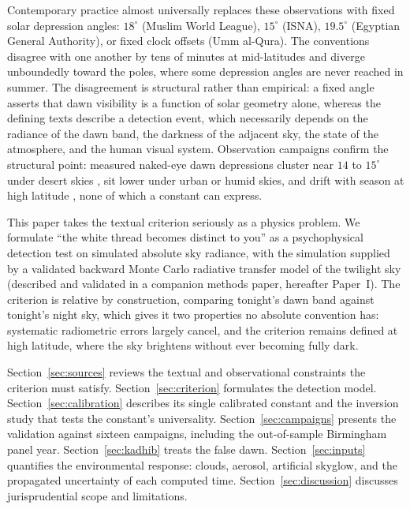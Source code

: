 \documentclass[preprint,12pt]{elsarticle}
\begin{document}
Contemporary practice almost universally replaces these observations with
fixed solar depression angles: $18^\circ$ (Muslim World League),
$15^\circ$ (ISNA), $19.5^\circ$ (Egyptian General Authority), or fixed
clock offsets (Umm al-Qura). The conventions disagree with one another by
tens of minutes at mid-latitudes and diverge unboundedly toward the
poles, where some depression angles are never reached in summer. The
disagreement is structural rather than empirical: a fixed angle asserts
that dawn visibility is a function of solar geometry alone, whereas the
defining texts describe a detection event, which necessarily depends on
the radiance of the dawn band, the darkness of the adjacent sky, the
state of the atmosphere, and the human visual system. Observation
campaigns confirm the structural point: measured naked-eye dawn
depressions cluster near $14$ to $15^\circ$ under desert skies
\citep{almostafa2005,khalifa2018,mawad2024}, sit lower under urban or
humid skies, and drift with season at high latitude
\citep{openfajr2016}, none of which a constant can express.

This paper takes the textual criterion seriously as a physics problem.
We formulate ``the white thread becomes distinct to you'' as a
psychophysical detection test on simulated absolute sky radiance, with
the simulation supplied by a validated backward Monte Carlo radiative
transfer model of the twilight sky (described and validated in a
companion methods paper, hereafter Paper~I). The criterion is relative
by construction, comparing tonight's dawn band against tonight's night
sky, which gives it two properties no absolute convention has: systematic
radiometric errors largely cancel, and the criterion remains defined at
high latitude, where the sky brightens without ever becoming fully dark.

Section~\ref{sec:sources} reviews the textual and observational
constraints the criterion must satisfy. Section~\ref{sec:criterion}
formulates the detection model. Section~\ref{sec:calibration} describes
its single calibrated constant and the inversion study that tests the
constant's universality. Section~\ref{sec:campaigns} presents the
validation against sixteen campaigns, including the out-of-sample
Birmingham panel year. Section~\ref{sec:kadhib} treats the false dawn.
Section~\ref{sec:inputs} quantifies the environmental response: clouds,
aerosol, artificial skyglow, and the propagated uncertainty of each
computed time. Section~\ref{sec:discussion} discusses jurisprudential
scope and limitations.
\end{document}
